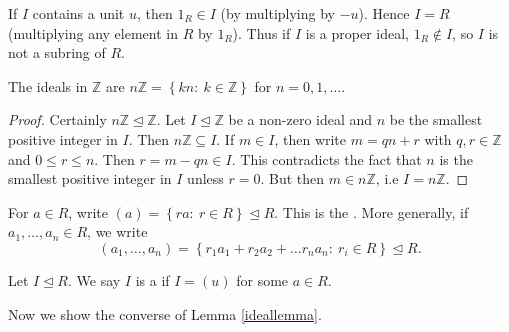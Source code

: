\documentclass[egregdoesnotlikesansseriftitles,a4paper]{scrartcl}
\begin{document}
\begin{remark}
       If $I$ contains a unit $u$, then $1_{R} \in I$ (by multiplying by $-u$). Hence $I=R$ (multiplying any element in $R$ by $1_{R}$). Thus if $I$ is a proper ideal, $1_{R}\notin I$, so $I$ is not a subring of $R$.
\end{remark}
\begin{lemma}\label{idealsinZ}
       The ideals in $\mathbb{Z}$ are $n\mathbb{Z}= \left\{kn: \ k \in \mathbb{Z}\right\}$ for $n=0,1, \ldots$.
       \begin{proof}
            Certainly $n\mathbb{Z} \unlhd \mathbb{Z}$. Let $I \unlhd \mathbb{Z}$ be a non-zero ideal and $n$ be the smallest positive integer in $I$. Then $n\mathbb{Z} \subseteq I$. If $m \in I$, then write $m=qn+r$ with $q,r \in \mathbb{Z}$ and $0 \leq r \leq n$. Then $r=m-qn \in I$. This contradicts the fact that $n$ is the smallest positive integer in $I$ unless $r=0$. But then $m\in n\mathbb{Z}$, i.e $I=n\mathbb{Z}$.
     \end{proof}
\end{lemma}
\begin{definition*}
       For $a \in R$, write $(a)=\left\{ra : \ r \in R\right\}\unlhd R$. This is the . More generally, if $a_1 , \ldots, a_n \in R$, we write \[
       (a_1 , \ldots, a_{n})=\left\{r_1 a_1 +r_2 a_2 +\ldots r_{n}a_{n}: \ r_{i}\in R\right\} \unlhd R
       .\] 
\end{definition*}
\begin{definition*}
       Let $I \unlhd R$. We say $I$ is a  if $I =(u)$ for some $a \in R$.
\end{definition*}
Now we show the converse of Lemma \ref{ideallemma}.
\end{document}
